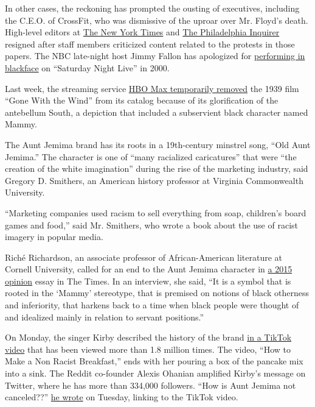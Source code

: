 In other cases, the reckoning has prompted the ousting of executives,
including the C.E.O. of CrossFit, who was dismissive of the uproar over
Mr. Floyd's death. High-level editors at
\href{https://www.nytimes.com/2020/06/07/business/media/james-bennet-resigns-nytimes-op-ed.html}{The
New York Times} and
\href{https://www.nytimes.com/2020/06/06/business/media/editor-philadephia-inquirer-resigns.html}{The
Philadelphia Inquirer} resigned after staff members criticized content
related to the protests in those papers. The NBC late-night host Jimmy
Fallon has apologized for
\href{https://www.nytimes.com/2020/05/26/us/jimmy-fallon-chris-rock-blackface.html}{performing
in blackface} on ``Saturday Night Live'' in 2000.

Last week, the streaming service
\href{https://www.nytimes.com/2020/06/10/business/media/gone-with-the-wind-hbo-max.html}{HBO
Max temporarily removed} the 1939 film ``Gone With the Wind'' from its
catalog because of its glorification of the antebellum South, a
depiction that included a subservient black character named Mammy.

The Aunt Jemima brand has its roots in a 19th-century minstrel song,
``Old Aunt Jemima.'' The character is one of ``many racialized
caricatures'' that were ``the creation of the white imagination'' during
the rise of the marketing industry, said Gregory D. Smithers, an
American history professor at Virginia Commonwealth University.

``Marketing companies used racism to sell everything from soap,
children's board games and food,'' said Mr. Smithers, who wrote a book
about the use of racist imagery in popular media.

Riché Richardson, an associate professor of African-American literature
at Cornell University, called for an end to the Aunt Jemima character in
\href{https://www.nytimes.com/roomfordebate/2015/06/24/besides-the-confederate-flag-what-other-symbols-should-go/can-we-please-finally-get-rid-of-aunt-jemima}{a
2015 opinion} essay in The Times. In an interview, she said, ``It is a
symbol that is rooted in the `Mammy' stereotype, that is premised on
notions of black otherness and inferiority, that harkens back to a time
when black people were thought of and idealized mainly in relation to
servant positions.''

On Monday, the singer Kirby described the history of the brand
\href{https://www.tiktok.com/@singkirbysing/video/6838642500052274438}{in
a TikTok video} that has been viewed more than 1.8 million times. The
video, ``How to Make a Non Racist Breakfast,'' ends with her pouring a
box of the pancake mix into a sink. The Reddit co-founder Alexis Ohanian
amplified Kirby's message on Twitter, where he has more than 334,000
followers. ``How is Aunt Jemima not canceled??''
\href{https://twitter.com/alexisohanian/status/1273071420017385473?s=20}{he
wrote} on Tuesday, linking to the TikTok video.

